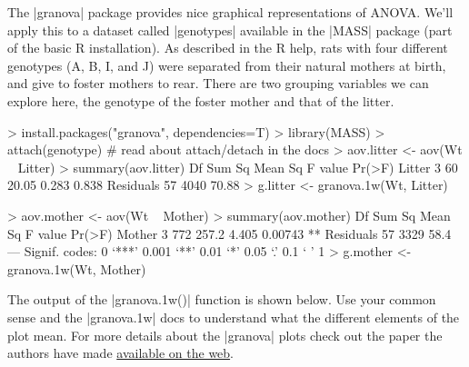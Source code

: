 The |granova| package provides nice graphical representations of ANOVA. We'll apply this to a dataset called |genotypes| available in the |MASS| package (part of the basic R installation).  As described in the R help, rats with four different genotypes (A, B, I, and J) were separated from their natural mothers at birth, and give to foster mothers to rear.  There are two grouping variables we can explore here, the genotype of the foster mother and that of the litter.
\begin{R}
> install.packages("granova", dependencies=T)
> library(MASS)
> attach(genotype) # read about attach/detach in the docs
> aov.litter <- aov(Wt ~ Litter)
> summary(aov.litter)
            Df Sum Sq Mean Sq F value Pr(>F)
Litter       3     60   20.05   0.283  0.838
Residuals   57   4040   70.88               
> g.litter <- granova.1w(Wt, Litter)


> aov.mother <- aov(Wt ~ Mother)
> summary(aov.mother)
            Df Sum Sq Mean Sq F value  Pr(>F)   
Mother       3    772   257.2   4.405 0.00743 **
Residuals   57   3329    58.4                   
---
Signif. codes:  0 ‘***’ 0.001 ‘**’ 0.01 ‘*’ 0.05 ‘.’ 0.1 ‘ ’ 1 
> g.mother <- granova.1w(Wt, Mother)
\end{R}
%


The output of the |granova.1w()| function is shown below. Use your common sense and the |granova.1w| docs to understand what the different elements of the plot mean.  For more details about the |granova| plots check out the paper the authors have made \href{http://rmpruzek.com/wp-content/uploads/2011/07/ElementalGraphicsForANOVA.finalJune11.pdf}{available on the web}.

